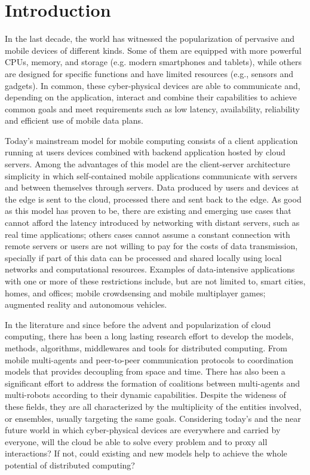\section{Introduction}
\label{sec:intro}


In the last decade, the world has witnessed the popularization of pervasive and mobile devices of different kinds. Some of them are equipped with more powerful CPUs, memory, and storage (e.g. modern smartphones and tablets), while others are designed for specific functions and have limited resources (e.g., sensors and gadgets). In common, these cyber-physical devices are able to communicate and, depending on the application, interact and combine their capabilities to achieve common goals and meet requirements such as low latency, availability, reliability and efficient use of mobile data plans.

Today's mainstream model for mobile computing consists of a client application running at users devices combined with backend application hosted by cloud servers. Among the advantages of this model are the client-server architecture simplicity in which self-contained mobile applications communicate with servers and between themselves through servers. Data produced by users and devices at the edge is sent to the cloud, processed there and sent back to the edge. As good as this model has proven to be, there are existing and emerging use cases that cannot afford the latency introduced by networking with distant servers, such as real time applications; others cases cannot assume a constant connection with remote servers or users are not willing to pay for the costs of data transmission, specially if part of this data can be processed and shared locally using local networks and computational resources. Examples of data-intensive applications with one or more of these restrictions include, but are not limited to, smart cities, homes, and offices; mobile crowdsensing and mobile multiplayer games; augmented reality and autonomous vehicles.

In the literature and since before the advent and popularization of cloud computing, there has been a long lasting research effort to develop the models, methods, algorithms, middlewares and tools for distributed computing. From mobile multi-agents and peer-to-peer communication protocols to coordination models that provides decoupling from space and time. There has also been a significant effort to address the formation of coalitions between multi-agents and multi-robots according to their dynamic capabilities. Despite the wideness of these fields, they are all characterized by the multiplicity of the entities involved, or ensembles, usually targeting the same goals. Considering today's and the near future world in which cyber-physical devices are everywhere and carried by everyone, will the cloud be able to solve every problem and to proxy all interactions? If not, could existing and new models help to achieve the whole potential of distributed computing?

